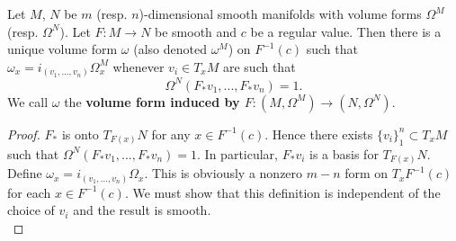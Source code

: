 \begin{proposition}\label{induced_vol_form}
Let $M$, $N$ be $m$ (resp. $n$)-dimensional smooth manifolds with volume forms $\Omega^M$ (resp. $\Omega^N$). Let $F:M\rightarrow N$ be smooth and $c$ be a regular value.  Then there is a unique volume form $\omega$  (also denoted $\omega^M$) on $F^{-1}(c)$ such that $\omega_x=i_{(v_1,...,v_n)}\Omega^M_x$ whenever $v_i\in T_xM$ are such that 
\begin{equation}\label{unit_volume}
\Omega^N(F_*v_1,...,F_* v_n)=1.
\end{equation}
We call $\omega$ the {\bf volume form induced by $F:(M,\Omega^M)\rightarrow (N,\Omega^N)$}.
\end{proposition}
\begin{proof}
$F_*$ is onto $T_{F(x)}N$ for any $x\in F^{-1}(c)$.  Hence there exists $\{v_i\}_1^n\subset T_xM$ such that $\Omega^N(F_*v_1,...,F_* v_n)=1$.  In particular, $F_* v_i$ is a basis for $T_{F(x)} N$.  Define $\omega_x=i_{(v_1,...,v_n)}\Omega_x$. This is obviously a nonzero $m-n$ form on $T_xF^{-1}(c)$ for each $x\in F^{-1}(c)$.  We must show that this definition is independent of the choice of $v_i$ and the result is smooth.\\


\end{proof}
